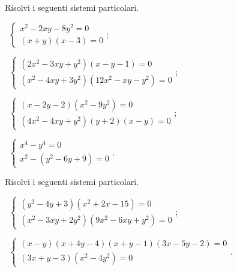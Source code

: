 \begin{esercizio}[\Ast]
 \label{ese:6.47}
Risolvi i seguenti sistemi particolari.
 \begin{enumeratea}
 \item~$\left\{\begin{array}{l}x^2-2xy-8y^2=0\\(x+y)(x-3)=0\end{array}\right.$;
 \item~$\left\{\begin{array}{l}(2x^2-3xy+y^2)(x-y-1)=0 \\(x^2-4xy+3y^2)(12x^2-xy-y^2)=0 \end{array}\right.$;
 \item~$\left\{\begin{array}{l}(x-2y-2)(x^2-9y^2)=0 \\(4x^2-4xy+y^2)(y+2)(x-y)=0 \end{array}\right.$;
 \item~$\left\{\begin{array}{l}x^4-y^4=0 \\x^2-(y^2-6y+9)=0 \end{array}\right.$.
 \end{enumeratea}
\end{esercizio}

\begin{esercizio}[\Ast]
 \label{ese:6.48}
Risolvi i seguenti sistemi particolari.
 \begin{enumeratea}
 \item~$\left\{\begin{array}{l}(y^2-4y+3)(x^2+2x-15)=0 \\(x^2-3xy+2y^2)(9x^2-6xy+y^2)=0 \end{array}\right.$;
 \item~$\left\{\begin{array}{l}(x-y)(x+4y-4)(x+y-1)(3x-5y-2)=0 \\(3x+y-3)(x^2-4y^2)=0 \end{array}\right.$.
 \end{enumeratea}
\end{esercizio}

